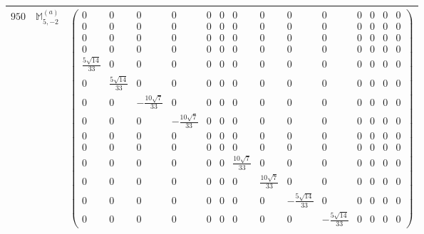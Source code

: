 \documentclass[fleqn,8pt,landscape]{jsarticle}
\begin{document}
\begin{center}
\begin{longtable}{ccc}
$ 950 $ & $ \mathbb{M}_{5,-2}^{(a)} $ & $ \begin{pmatrix} 0 & 0 & 0 & 0 & 0 & 0 & 0 & 0 & 0 & 0 & 0 & 0 & 0 & 0 \\ 0 & 0 & 0 & 0 & 0 & 0 & 0 & 0 & 0 & 0 & 0 & 0 & 0 & 0 \\ 0 & 0 & 0 & 0 & 0 & 0 & 0 & 0 & 0 & 0 & 0 & 0 & 0 & 0 \\ 0 & 0 & 0 & 0 & 0 & 0 & 0 & 0 & 0 & 0 & 0 & 0 & 0 & 0 \\ \frac{5 \sqrt{14}}{33} & 0 & 0 & 0 & 0 & 0 & 0 & 0 & 0 & 0 & 0 & 0 & 0 & 0 \\ 0 & \frac{5 \sqrt{14}}{33} & 0 & 0 & 0 & 0 & 0 & 0 & 0 & 0 & 0 & 0 & 0 & 0 \\ 0 & 0 & - \frac{10 \sqrt{7}}{33} & 0 & 0 & 0 & 0 & 0 & 0 & 0 & 0 & 0 & 0 & 0 \\ 0 & 0 & 0 & - \frac{10 \sqrt{7}}{33} & 0 & 0 & 0 & 0 & 0 & 0 & 0 & 0 & 0 & 0 \\ 0 & 0 & 0 & 0 & 0 & 0 & 0 & 0 & 0 & 0 & 0 & 0 & 0 & 0 \\ 0 & 0 & 0 & 0 & 0 & 0 & 0 & 0 & 0 & 0 & 0 & 0 & 0 & 0 \\ 0 & 0 & 0 & 0 & 0 & 0 & \frac{10 \sqrt{7}}{33} & 0 & 0 & 0 & 0 & 0 & 0 & 0 \\ 0 & 0 & 0 & 0 & 0 & 0 & 0 & \frac{10 \sqrt{7}}{33} & 0 & 0 & 0 & 0 & 0 & 0 \\ 0 & 0 & 0 & 0 & 0 & 0 & 0 & 0 & - \frac{5 \sqrt{14}}{33} & 0 & 0 & 0 & 0 & 0 \\ 0 & 0 & 0 & 0 & 0 & 0 & 0 & 0 & 0 & - \frac{5 \sqrt{14}}{33} & 0 & 0 & 0 & 0 \end{pmatrix} $ \\ \hline

\end{longtable}
\end{center}
\end{document}
